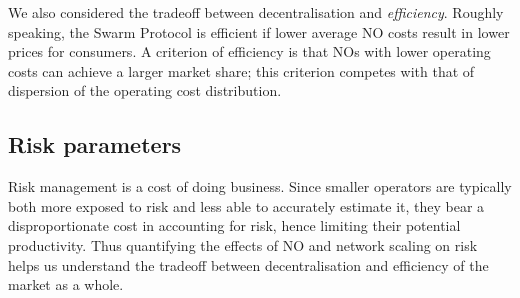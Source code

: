 We also considered the tradeoff between decentralisation and \emph{efficiency}.
%
Roughly speaking, the Swarm Protocol is efficient if lower average NO costs result in lower prices for consumers.
%
A criterion of efficiency is that NOs with lower operating costs can achieve a larger market share; this criterion competes with that of dispersion of the operating cost distribution.

\begin{comment}
\subsubsection*{List of objectives}

Here are the revised candidate objectives for the NO incentive system:

\begin{enumerate}
  \item \emph{Incentivise service provision.} See above.
  \item \emph{Sybil resistance.} See August report.
  \item \emph{Penalising safety replication failures.} Nodes that fail to report storage proofs for the ``correct'' set of chunks for their neighbourhood should be penalised by having their stake slashed and hence their authorisation to participate in redistribution revoked.
  
  Replication failures are a failure of consensus, hence arguably a type of \emph{safety fault}, not a liveness fault as indicated in last month's report.
  However, the replication consensus system itself is 

  \item \emph{Limited returns to operator scale.} See above.
  \item \emph{Create or accentuate demand pressure for BZZ token.} See August report.
\end{enumerate}
\end{comment}

\subsection*{Risk parameters}

Risk management is a cost of doing business.
%
Since smaller operators are typically both more exposed to risk and less able to accurately estimate it, they bear a disproportionate cost in accounting for risk, hence limiting their potential productivity.
%
Thus quantifying the effects of NO and network scaling on risk helps us understand the tradeoff between decentralisation and efficiency of the market as a whole.

